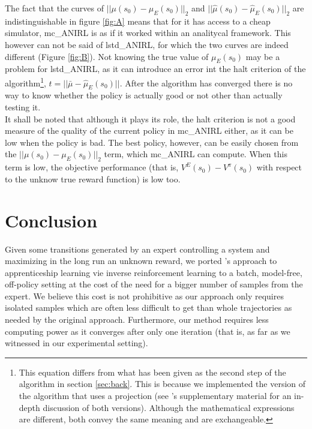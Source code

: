 \documentclass{jfpda2011}
\begin{document}
The fact that  the curves of  $||\mu(s_0) - \mu_E(s_0)||_2$ and $||\hat\mu(s_0) - \hat\mu_E(s_0)||_2$ are indistinguishable in figure \ref{fig:A} means that for it has access to a cheap simulator, mc\_ANIRL is as if it worked within an analitycal framework. This however can not be said of lstd\_ANIRL, for which the two curves are indeed different (Figure \ref{fig:B}). Not knowing the true value of $\mu_E(s_0)$ may be a problem for lstd\_ANIRL, as it can introduce an error int the halt criterion of the algorithm\footnote{This equation differs from what has been given as the second step of the algorithm in section \ref{sec:back}. This is because we implemented the version of the algorithm that uses a projection (see \citet{abbeel2004apprenticeship}'s supplementary material for an in-depth discussion of both versions). Although the mathematical expressions are different, both convey the same meaning and are exchangeable.}, $t = ||\bar\mu-\hat\mu_E(s_0)||$. After the algorithm has converged there is no way to know whether the policy is actually good or not other than actually testing it.\\

It shall be noted that although it plays its role, the halt criterion is not a good measure of the quality of the current policy in mc\_ANIRL either, as it can be low when the policy is bad. The best policy, however, can be easily chosen from the $||\mu(s_0) - \mu_E(s_0)||_2$ term, which mc\_ANIRL can compute. When this term is low, the objective performance (that is, $V^E(s_0)-V^\pi(s_0)$ with respect to the unknow true reward function) is low too. 
\section{Conclusion}
\label{sec:conclusion}
Given some transitions generated by an expert controlling a system and maximizing in the long run an unknown reward, we ported \citet{abbeel2004apprenticeship}'s approach to apprenticeship learning vie inverse reinforcement learning to a batch, model-free, off-policy setting at the cost of the need for a bigger number of samples from the expert. We believe this cost is not prohibitive as our approach only requires isolated samples which are often less difficult to get than whole trajectories as needed by the original approach. Furthermore, our method requires less computing power as it converges after only one iteration (that is, as far as we witnessed in our experimental setting).\\
\end{document}
